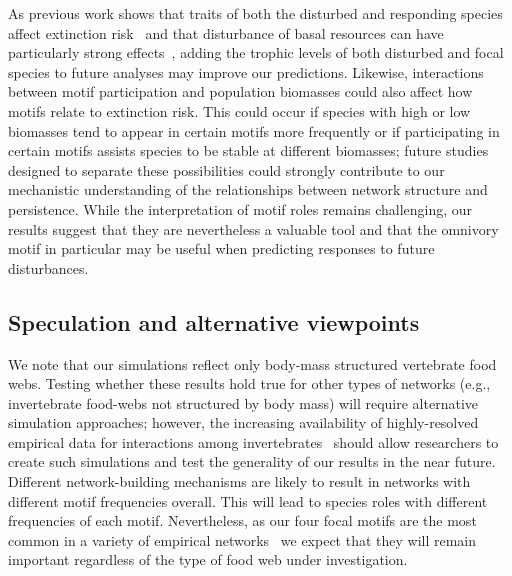 \documentclass[12pt]{article}
\begin{document}
\begin{spacing}{2.0}
    
        As previous work shows that traits of both the disturbed and responding species affect extinction risk~\citep{Wootton2016} and that disturbance of basal resources can have particularly strong effects~\citep{Scherber2010}, adding the trophic levels of both disturbed and focal species to future analyses may improve our predictions.
        Likewise, interactions between motif participation and population biomasses could also affect how motifs relate to extinction risk.
        This could occur if species with high or low biomasses tend to appear in certain motifs more frequently or if participating in certain motifs assists species to be stable at different biomasses; future studies designed to separate these possibilities could strongly contribute to our mechanistic understanding of the relationships between network structure and persistence.
        While the interpretation of motif roles remains challenging, our results suggest that they are nevertheless a valuable tool and that the omnivory motif in particular may be useful when predicting responses to future disturbances.
        

    \subsection*{Speculation and alternative viewpoints}

        We note that our simulations reflect only body-mass structured vertebrate food webs.
        Testing whether these results hold true for other types of networks (e.g., invertebrate food-webs not structured by body mass) will require alternative simulation approaches; however, the increasing availability of highly-resolved empirical data for interactions among invertebrates~\citep{Waldner2012} should allow researchers to create such simulations and test the generality of our results in the near future.
        Different network-building mechanisms are likely to result in networks with different motif frequencies overall.
        This will lead to species roles with different frequencies of each motif.
        Nevertheless, as our four focal motifs are the most common in a variety of empirical networks~\citep{Stouffer2007} we expect that they will remain important regardless of the type of food web under investigation.
        

\end{spacing}
\end{document}
